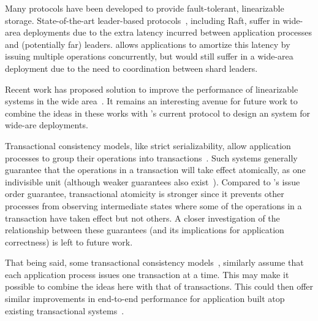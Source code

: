 
Many protocols have been developed to provide fault-tolerant, linearizable storage.
State-of-the-art leader-based
protocols~\cite{ongaro2014raft,lamport1998paxos,oki1988vr},
including Raft, suffer in wide-area deployments due to the extra
latency incurred between application processes and (potentially far)
leaders. \MDL{} allows applications to amortize this latency
by issuing multiple operations concurrently, but \sys{} would
still suffer in a wide-area deployment due to the need to coordination
between shard leaders.


Recent work has proposed solution to improve the performance of
linearizable systems in the wide
area~\cite{mao2008mencius,moraru2013epaxos,burke2020gryff}. It remains
an interesting avenue for future work to combine the ideas in these works with \sys{}'s current protocol to design an \MDL{} system
for wide-are deployments.


Transactional consistency models, like strict serializability,
allow application processes to group their operations into
transactions~\cite{papadimitriou1979serializability}. Such
systems generally guarantee that the operations in a transaction
will take effect atomically, as one indivisible unit (although weaker 
guarantees also exist~\cite{adya1999weakcons}).
Compared to \MDL{}'s issue order guarantee, transactional atomicity 
is stronger since it prevents other processes from observing 
intermediate states where some of the operations in a transaction 
have taken effect but not others. A closer investigation
of the relationship between these guarantees (and its
implications for application correctness) is left to future work.

That being said, some transactional consistency
models~\cite{papadimitriou1979serializability,adya1999weakcons}, similarly assume that 
each application process issues one transaction at a time. This may 
make it possible to combine the ideas here with that of transactions. 
This could then offer similar improvements in end-to-end 
performance for application built atop existing transactional 
systems~\cite{thomson2014calvin,mahmoud2013replicatedCommit,zhang2018tapir,mu2014rococo,mu2016janus,kraska2013mdcc,ren2019slog,taft2020crdb,yan2018carousel}.


